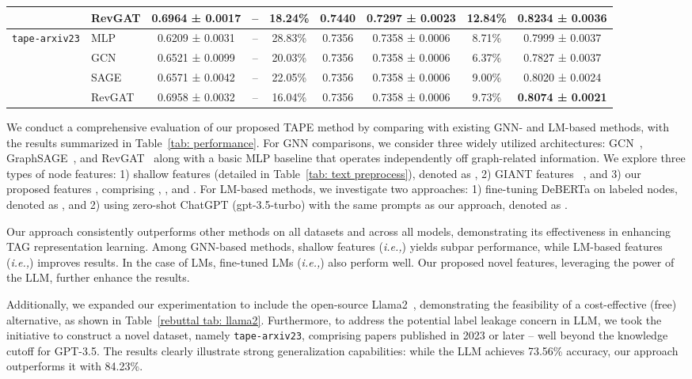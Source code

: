 \documentclass{article}
\newcommand{\ie}{\emph{i.e.,}\xspace}
\begin{document}
\begin{table}[!ht]
\begin{tabular}{llccccccc}
    \\
     & RevGAT
    & 0.6964 ± 0.0017
    & --
    & 18.24\%
    & 0.7440
    & 0.7297 ± 0.0023
    & 12.84\% 
    & \textbf{0.8234 ± 0.0036}
    \\
    \midrule
    \multirow{4}{*}{\texttt{tape-arxiv23}} 
    & MLP 
    & 0.6209 ± 0.0031
    & -- 
    & 28.83\%
    & 0.7356
    & 0.7358 ± 0.0006
    & 8.71\%
    & 0.7999 ± 0.0037
    \\
    & GCN 
    & 0.6521 ± 0.0099
    & -- 
    & 20.03\%
    & 0.7356 
    & 0.7358 ± 0.0006
    & 6.37\%
    & 0.7827 ± 0.0037
    \\
    & SAGE 
    & 0.6571 ± 0.0042
    & -- 
    & 22.05\%
    & 0.7356 
    & 0.7358 ± 0.0006
    & 9.00\%
    & 0.8020 ± 0.0024
    \\
    & RevGAT 
    & 0.6958 ± 0.0032
    & -- 
    & 16.04\%
    & 0.7356
    & 0.7358 ± 0.0006
    & 9.73\%
    & \textbf{0.8074 ± 0.0021}
    \\
    \bottomrule    
    \end{tabular}
    
\end{table}
We conduct a comprehensive evaluation of our proposed TAPE method by comparing with existing GNN- and LM-based methods, with the results summarized in Table~\ref{tab: performance}. For GNN comparisons, we consider three widely utilized architectures:  GCN~\citep{kipf2016semi_gcn}, GraphSAGE~\citep{sun2021scalable_sagn}, and RevGAT~\citep{li2021training_revgat} along with a basic MLP baseline that operates independently off graph-related information. We explore three types of node features: 1) shallow features (detailed in Table~\ref{tab: text preprocess}), denoted as , 2) GIANT features~\citep{chien2021node_giant} , and 3) our proposed features , comprising , , and . For LM-based methods, we investigate two approaches: 1) fine-tuning DeBERTa on labeled nodes, denoted as , and 2) using zero-shot ChatGPT (gpt-3.5-turbo) with the same prompts as our approach, denoted as . 

Our approach consistently outperforms other methods on all datasets and across all  models, demonstrating its effectiveness in enhancing TAG representation learning. Among GNN-based methods, shallow features (\ie ) yields subpar performance, while LM-based features (\ie ) improves results. In the case of LMs, fine-tuned LMs (\ie ) also perform well. Our proposed novel features, leveraging the power of the LLM, further enhance the results.  


Additionally, we expanded our experimentation to include the open-source Llama2~\citep{touvron2023llama}, demonstrating the feasibility of a cost-effective (free) alternative, as shown in Table~\ref{rebuttal tab: llama2}. Furthermore, to address the potential label leakage concern in LLM, we took the initiative to construct a novel dataset, namely \texttt{tape-arxiv23}, comprising papers published in 2023 or later -- well beyond the knowledge cutoff for GPT-3.5. The results clearly illustrate strong generalization capabilities: while the LLM achieves 73.56\% accuracy, our approach outperforms it with 84.23\%. 
\end{document}
